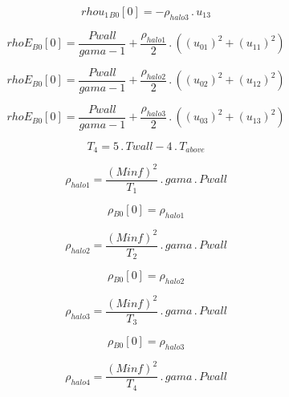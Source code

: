 \documentclass{article}
\begin{document}
\begin{dmath}{rhou_{1}{_{B0}}}[{0}] = - \rho_{halo 3} \,.\, u_{13}\end{dmath}

\begin{dmath}{rhoE{_{B0}}}[{0}] = \frac{Pwall}{gama - 1} + \frac{\rho_{halo 1}}{2} \,.\, \left(\left(u_{01} \right)^{2} + \left(u_{11} \right)^{2}\right)\end{dmath}

\begin{dmath}{rhoE{_{B0}}}[{0}] = \frac{Pwall}{gama - 1} + \frac{\rho_{halo 2}}{2} \,.\, \left(\left(u_{02} \right)^{2} + \left(u_{12} \right)^{2}\right)\end{dmath}

\begin{dmath}{rhoE{_{B0}}}[{0}] = \frac{Pwall}{gama - 1} + \frac{\rho_{halo 3}}{2} \,.\, \left(\left(u_{03} \right)^{2} + \left(u_{13} \right)^{2}\right)\end{dmath}

\begin{dmath}T_{4} = 5 \,.\, Twall - 4 \,.\, T_{above}\end{dmath}

\begin{dmath}\rho_{halo 1} = \frac{\left(Minf \right)^{2}}{T_{1}} \,.\, gama \,.\, Pwall\end{dmath}

\begin{dmath}{\rho{_{B0}}}[{0}] = \rho_{halo 1}\end{dmath}

\begin{dmath}\rho_{halo 2} = \frac{\left(Minf \right)^{2}}{T_{2}} \,.\, gama \,.\, Pwall\end{dmath}

\begin{dmath}{\rho{_{B0}}}[{0}] = \rho_{halo 2}\end{dmath}

\begin{dmath}\rho_{halo 3} = \frac{\left(Minf \right)^{2}}{T_{3}} \,.\, gama \,.\, Pwall\end{dmath}

\begin{dmath}{\rho{_{B0}}}[{0}] = \rho_{halo 3}\end{dmath}

\begin{dmath}\rho_{halo 4} = \frac{\left(Minf \right)^{2}}{T_{4}} \,.\, gama \,.\, Pwall\end{dmath}
\end{document}
